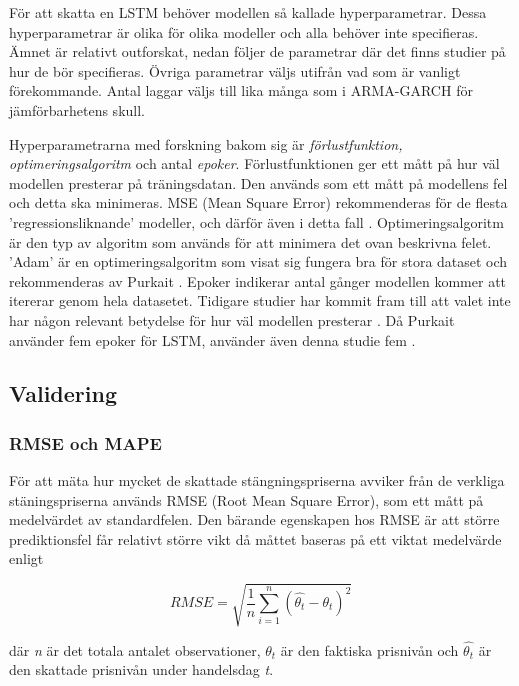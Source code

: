 \documentclass[11pt]{article}
\numberwithin{equation}{section}
\numberwithin{table}{section}
\numberwithin{figure}{section}
\begin{document}
För att skatta en LSTM behöver modellen så kallade hyperparametrar. Dessa hyperparametrar är olika för olika modeller och alla behöver inte specifieras. Ämnet är relativt outforskat, nedan följer de parametrar där det finns studier på hur de bör specifieras. Övriga parametrar väljs utifrån vad som är vanligt förekommande. Antal laggar väljs till lika många som i ARMA-GARCH för jämförbarhetens skull.

Hyperparametrarna med forskning bakom sig är \textit{förlustfunktion, optimeringsalgoritm} och antal \textit{epoker}. Förlustfunktionen ger ett mått på hur väl modellen presterar på träningsdatan. Den används som ett mått på modellens fel och detta ska minimeras. MSE (Mean Square Error) rekommenderas för de flesta 'regressionsliknande' modeller, och därför även i detta fall \parencite[][,s.178 ff.]{purkait2019hands}. Optimeringsalgoritm är den typ av algoritm som används för att minimera det ovan beskrivna felet. 'Adam' är en optimeringsalgoritm som visat sig fungera bra för stora dataset och rekommenderas av Purkait \parencite*[][,s.178 ff.]{purkait2019hands}. Epoker indikerar antal gånger modellen kommer att itererar genom hela datasetet. Tidigare studier har kommit fram till att valet inte har någon relevant betydelse för hur väl modellen presterar \parencite{siaminamini2018forecasting}. Då Purkait använder fem epoker för LSTM, använder även denna studie fem \parencite[][,s.178 ff.]{purkait2019hands}.


\subsection{Validering}
\subsubsection{RMSE och MAPE}
För att mäta hur mycket de skattade stängningspriserna avviker från de verkliga stäningspriserna används RMSE (Root Mean Square Error), som ett mått på medelvärdet av standardfelen. Den bärande egenskapen hos RMSE är att större prediktionsfel får relativt större vikt då måttet baseras på ett viktat medelvärde enligt

\begin{equation}
RMSE = \sqrt{\frac{1}{n}\sum_{i=1}^{n}   (\hat{\theta_{t}} - \theta_{t})^2}
\end{equation}

där \emph{n} är det totala antalet observationer, $\theta_{t}$ är den faktiska prisnivån och $\hat{\theta_{t}}$ är den skattade prisnivån under handelsdag \emph{t}. 
\end{document}
